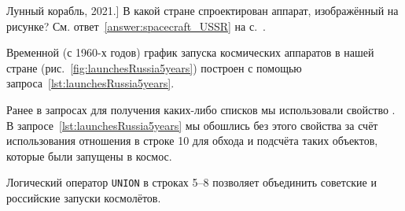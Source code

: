 \begin{marginfigure}
{
	\setlength{\fboxsep}{0pt}%
	\setlength{\fboxrule}{1pt}%
}
\caption
[Лунный корабль, 2021.]
{
В какой стране спроектирован аппарат, изображённый на рисунке?
См. ответ~\ref{answer:spacecraft_USSR} на с.~\pageref{answer:spacecraft_USSR}.
}
\label{question:spacecraft_lunar}
\end{marginfigure}

Временной (с 1960-х годов) 
график запуска космических аппаратов в нашей стране (рис.~\ref{fig:launchesRussia5years}) 
построен с помощью запроса~\ref{lst:launchesRussia5years}.%

Ранее в запросах для получения каких-либо списков мы использовали свойство . 
В запросе~\ref{lst:launchesRussia5years} мы обошлись без этого свойства за счёт использования отношения 
 в строке 10 
для обхода и подсчёта таких объектов, которые были запущены в космос.  

Логический оператор \lstinline|UNION| в строках 5--8 
позволяет объединить советские и российские запуски космолётов. 

